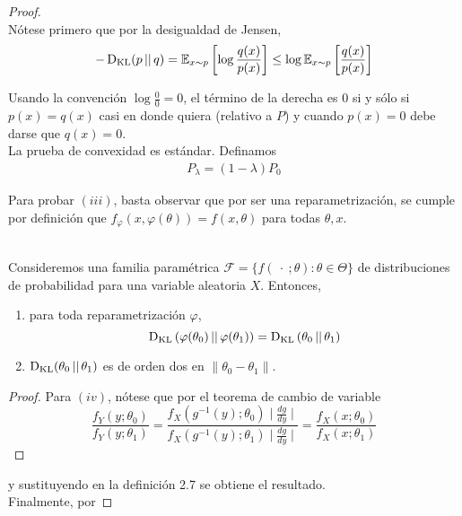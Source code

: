 \documentclass[main.tex]{subfiles}
\begin{document}
\begin{proof} \ \\
Nótese primero que por la desigualdad de Jensen,
\begin{equation*}
-\operatorname*{D_{KL}}(p\operatorname*{\mid\mid} q) 
	= \mathbb{E}_{x\sim p}\left[\log\frac{q(x)}{p(x)}\right]
	\leq\log\mathbb{E}_{x\sim p}\left[\frac{q(x)}{p(x)}\right]
\end{equation*}

Usando la convención $\log\frac{0}{0}=0$, el término de la derecha es 0 si y sólo si $p(x)=q(x)$ casi en donde quiera (relativo a $P$) y cuando $p(x)=0$ debe darse que $q(x)=0$. \\

La prueba de convexidad es estándar. Definamos
\begin{align*}
	P_\lambda = (1-\lambda)P_0	
\end{align*}


Para probar $(iii)$, basta observar que por ser una reparametrización, se cumple por definición que $f_\varphi(x, \varphi(\theta))=f(x, \theta)$ para todas $\theta, x$. \\


\begin{theorem} \ \\
Consideremos una familia paramétrica $\mathcal{F} = \{f(\ \cdot \ ;\theta): \theta \in \Theta \}$ de distribuciones de probabilidad para una variable aleatoria $X$. Entonces,
\begin{enumerate}[label=\roman*.]
	\item para toda reparametrización $\varphi$,
		\begin{equation*}
		\operatorname*{D_{KL}}\left(\varphi(\theta_0)\operatorname*{\mid\mid}\varphi(\theta_1)\right) = 
			\operatorname*{D_{KL}}\left(\theta_0\operatorname*{\mid\mid}\theta_1\right)
		\end{equation*}
		
	\item $\operatorname*{D_{KL}}(\theta_0\operatorname*{\mid\mid} \theta_1)$ es de orden dos en $\|\theta_0-\theta_1\|$.
\end{enumerate} 
\end{theorem}
\begin{proof}
Para $(iv)$, nótese que por el teorema de cambio de variable
\begin{equation*}
\frac{f_Y(y;\theta_0)}{f_Y(y;\theta_1)} = 
\frac{f_X\left(g^{-1}(y); \theta_0\right)\mid\frac{dg}{dy}\mid}
{f_X\left(g^{-1}(y); \theta_1\right)\mid\frac{dg}{dy}\mid} = 
\frac{f_X(x;\theta_0)}{f_X(x;\theta_1)}
\end{equation*}
\end{proof}

y sustituyendo en la definición 2.7 se obtiene el resultado. \\


Finalmente, por 
\end{proof}
\end{document}
